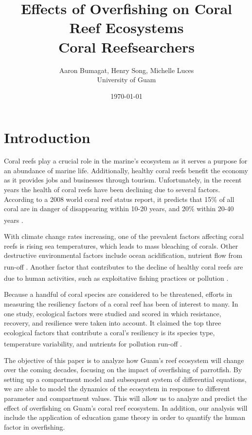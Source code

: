 \documentclass[12pt]{article}
\title{Effects of Overfishing on Coral Reef Ecosystems\\\large{Coral Reefsearchers}}
\author{Aaron Bumagat, Henry Song, Michelle Luces\\University of Guam}
\date{\today}
\begin{document}
\maketitle
\section{Introduction}
Coral reefs play a crucial role in the marine's ecosystem as it serves a purpose for an abundance of marine life. Additionally, healthy coral reefs benefit the economy as it provides jobs and businesses through tourism. Unfortunately, in the recent years the health of coral reefs have been declining due to several factors. According to a 2008 world coral reef status report, it predicts that 15\% of all coral are in danger of disappearing within 10-20 years, and 20\% within 20-40 years \textsuperscript{\cite{05_quintero_machuca_cotto_bradley_ríos-soto_2016}}. 

With climate change rates increasing, one of the prevalent factors affecting coral reefs is rising sea temperatures, which leads to mass bleaching of corals. Other destructive environmental factors include ocean acidification, nutrient flow from run-off \textsuperscript{\cite{05_quintero_machuca_cotto_bradley_ríos-soto_2016}}. Another factor that contributes to the decline of healthy coral reefs are due to human activities, such as exploitative fishing practices or pollution \textsuperscript{\cite{04_mathanalysis}}. 

Because a handful of coral species are considered to be threatened, efforts in measuring the resiliency factors of a coral reef has been of interest to many. In one study, ecological factors were studied and scored in which resistance, recovery, and resilience were taken into account. It claimed the top three ecological factors that contribute a coral's resiliency is its species type, temperature variability, and nutrients for pollution run-off \textsuperscript{\cite{02_Riegl_Purkis_Model}}. 

The objective of this paper is to analyze how Guam's reef ecosystem will change over the coming decades, focusing on the impact of overfishing of parrotfish. By setting up a compartment model and subsequent system of differential equations, we are able to model the dynamics of the ecosystem in response to different parameter and compartment values. This will allow us to analyze and predict the effect of overfishing on Guam's coral reef ecosystem. In addition, our analysis will include the application of education game theory in order to quantify the human factor in overfishing.
\end{document}
